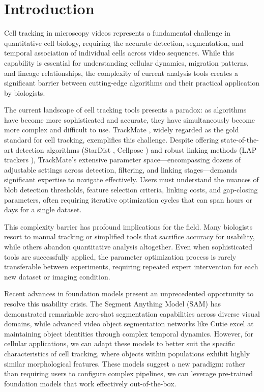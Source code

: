 \documentclass[../cellseek_paper.tex]{subfiles}
\begin{document}
\section{Introduction}

Cell tracking in microscopy videos represents a fundamental challenge in quantitative cell biology, requiring the accurate detection, segmentation, and temporal association of individual cells across video sequences. While this capability is essential for understanding cellular dynamics, migration patterns, and lineage relationships, the complexity of current analysis tools creates a significant barrier between cutting-edge algorithms and their practical application by biologists.

The current landscape of cell tracking tools presents a paradox: as algorithms have become more sophisticated and accurate, they have simultaneously become more complex and difficult to use. TrackMate \cite{tinevez2017trackmate}, widely regarded as the gold standard for cell tracking, exemplifies this challenge. Despite offering state-of-the-art detection algorithms (StarDist \cite{schmidt2018cell}, Cellpose \cite{stringer2021cellpose}) and robust linking methods (LAP trackers \cite{jaqaman2008robust}), TrackMate's extensive parameter space—encompassing dozens of adjustable settings across detection, filtering, and linking stages—demands significant expertise to navigate effectively. Users must understand the nuances of blob detection thresholds, feature selection criteria, linking costs, and gap-closing parameters, often requiring iterative optimization cycles that can span hours or days for a single dataset.

This complexity barrier has profound implications for the field. Many biologists resort to manual tracking or simplified tools that sacrifice accuracy for usability, while others abandon quantitative analysis altogether. Even when sophisticated tools are successfully applied, the parameter optimization process is rarely transferable between experiments, requiring repeated expert intervention for each new dataset or imaging condition.

Recent advances in foundation models present an unprecedented opportunity to resolve this usability crisis. The Segment Anything Model (SAM) \cite{kirillov2023segment} has demonstrated remarkable zero-shot segmentation capabilities across diverse visual domains, while advanced video object segmentation networks like Cutie \cite{cheng2024putting} excel at maintaining object identities through complex temporal dynamics. However, for cellular applications, we can adapt these models to better suit the specific characteristics of cell tracking, where objects within populations exhibit highly similar morphological features. These models suggest a new paradigm: rather than requiring users to configure complex pipelines, we can leverage pre-trained foundation models that work effectively out-of-the-box.
\end{document}
